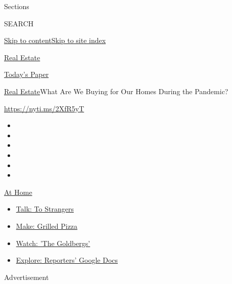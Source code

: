 Sections

SEARCH

\protect\hyperlink{site-content}{Skip to
content}\protect\hyperlink{site-index}{Skip to site index}

\href{https://www.nytimes.com/section/realestate}{Real Estate}

\href{https://myaccount.nytimes.com/auth/login?response_type=cookie\&client_id=vi}{}

\href{https://www.nytimes.com/section/todayspaper}{Today's Paper}

\href{/section/realestate}{Real Estate}\textbar{}What Are We Buying for
Our Homes During the Pandemic?

\url{https://nyti.ms/2XfR5yT}

\begin{itemize}
\item
\item
\item
\item
\item
\item
\end{itemize}

\href{https://www.nytimes.com/spotlight/at-home?action=click\&pgtype=Article\&state=default\&region=TOP_BANNER\&context=at_home_menu}{At
Home}

\begin{itemize}
\tightlist
\item
  \href{https://www.nytimes.com/2020/08/03/well/family/the-benefits-of-talking-to-strangers.html?action=click\&pgtype=Article\&state=default\&region=TOP_BANNER\&context=at_home_menu}{Talk:
  To Strangers}
\item
  \href{https://www.nytimes.com/2020/08/01/at-home/coronavirus-make-pizza-on-a-grill.html?action=click\&pgtype=Article\&state=default\&region=TOP_BANNER\&context=at_home_menu}{Make:
  Grilled Pizza}
\item
  \href{https://www.nytimes.com/2020/07/31/arts/television/goldbergs-abc-stream.html?action=click\&pgtype=Article\&state=default\&region=TOP_BANNER\&context=at_home_menu}{Watch:
  'The Goldbergs'}
\item
  \href{https://www.nytimes.com/interactive/2020/at-home/even-more-reporters-editors-diaries-lists-recommendations.html?action=click\&pgtype=Article\&state=default\&region=TOP_BANNER\&context=at_home_menu}{Explore:
  Reporters' Google Docs}
\end{itemize}

Advertisement

